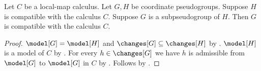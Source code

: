 \begin{classification}\label{subpseudogroup_calculus_compatible}
    Let $C$ be a local-map calculus.
    Let $G,H$ be coordinate pseudogroups.
    Suppose $H$ is compatible with the calculus $C$.
    Suppose $G$ is a subpseudogroup of $H$.
    Then $G$ is compatible with the calculus $C$.
\end{classification}
\begin{proof}
    $\model[G]=\model[H]$ and $\changes[G]\subseteq\changes[H]$ by .
    $\model[H]$ is a model of $C$ by .
    For every $h\in\changes[G]$ we have
        $h$ is admissible from $\model[G]$ to $\model[G]$ in $C$ by
        .
    Follows by .
\end{proof}

